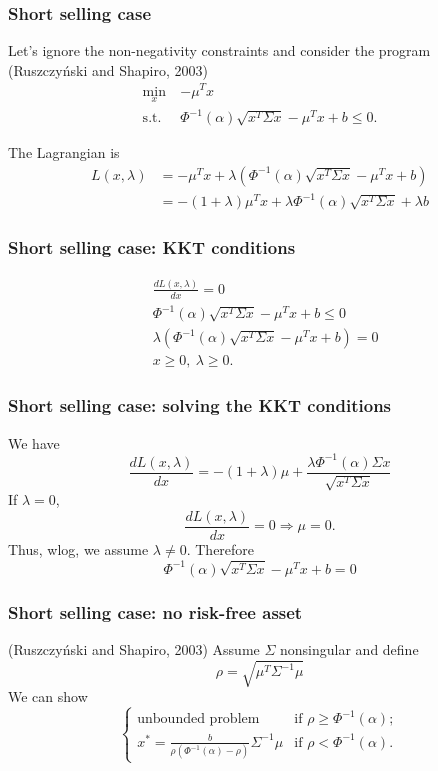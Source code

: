 \documentclass{beamer}
\begin{document}
\begin{frame}
\frametitle{Short selling case}

Let's ignore the non-negativity constraints and consider the program (Ruszczyński and Shapiro, 2003)
\begin{align*}
	\min_x \ & -\mu^T x \\
	\text{s.t. } & \Phi^{-1}(\alpha) \sqrt{x^T\Sigma x} - \mu^Tx + b \leq 0.
\end{align*}

The Lagrangian is
\begin{align*}
L(x, \lambda) &= -\mu^T x + \lambda \left( \Phi^{-1}(\alpha) \sqrt{x^T\Sigma x} - \mu^Tx + b \right) \\
&= -(1+\lambda) \mu^T x + \lambda \Phi^{-1}(\alpha) \sqrt{x^T\Sigma x} + \lambda b
\end{align*}

\end{frame}

\begin{frame}
	\frametitle{Short selling case: KKT conditions}

\begin{align*}
&	\frac{dL(x, \lambda)}{dx} = 0 \\
&	\Phi^{-1}(\alpha) \sqrt{x^T\Sigma x} - \mu^Tx + b \leq 0 \\
&	\lambda \left( \Phi^{-1}(\alpha) \sqrt{x^T\Sigma x} - \mu^Tx + b \right) = 0 \\
&	x \geq 0,\ \lambda \geq 0.
\end{align*}

\end{frame}

\begin{frame}
\frametitle{Short selling case: solving the KKT conditions}

We have
$$
\frac{dL(x, \lambda)}{dx} = -(1+\lambda)\mu+\frac{\lambda \Phi^{-1}(\alpha)\Sigma x}{\sqrt{x^T\Sigma x}}
$$
If $\lambda = 0$,
$$
\frac{dL(x, \lambda)}{dx} = 0 \Rightarrow \mu = 0.
$$
Thus, wlog, we assume $\lambda \ne 0$. Therefore
$$
\Phi^{-1}(\alpha) \sqrt{x^T\Sigma x} - \mu^Tx + b = 0
$$

\end{frame}

\begin{frame}
\frametitle{Short selling case: no risk-free asset}

(Ruszczyński and Shapiro, 2003)
Assume $\Sigma$ nonsingular and define
$$
\rho = \sqrt{ \mu^T \Sigma^{-1} \mu}
$$
We can show
$$
\begin{cases}
	\text{unbounded problem} & \text{if } \rho \geq \Phi^{-1}(\alpha); \\
	x^* = \frac{b}{\rho(\Phi^{-1}(\alpha)-\rho)} \Sigma^{-1} \mu & \text{if } \rho < \Phi^{-1}(\alpha).
\end{cases}
$$

\end{frame}
\end{document}
